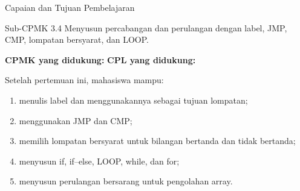 \documentclass[aspectratio=169,11pt]{beamer}
\begin{document}

\begin{frame}{Capaian dan Tujuan Pembelajaran}
\begin{block}{Sub-CPMK 3.4}
\footnotesize Menyusun percabangan dan perulangan dengan label, JMP,
CMP, lompatan bersyarat, dan LOOP.
\end{block}

\vspace{0.1em}
{\small\textbf{CPMK yang didukung:} \quad\textbullet\quad
\textbf{CPL yang didukung:} \par}

\vspace{0.15em}
\begin{exampleblock}{Setelah pertemuan ini, mahasiswa mampu:}
\footnotesize
\begin{enumerate}
    \item menulis label dan menggunakannya sebagai tujuan lompatan;
    \item menggunakan JMP dan CMP;
    \item memilih lompatan bersyarat untuk bilangan bertanda dan
          tidak bertanda;
    \item menyusun if, if--else, LOOP, while, dan for;
    \item menyusun perulangan bersarang untuk pengolahan array.
\end{enumerate}
\end{exampleblock}
\end{frame}
\end{document}
